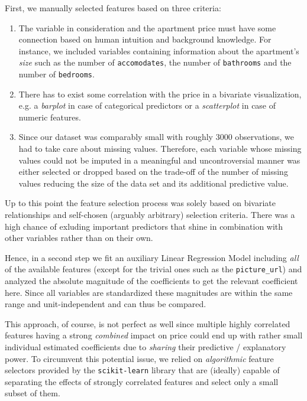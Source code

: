 \documentclass[12pt, letterpaper]{article}
\begin{document}
First, we manually selected features based on three criteria:
\begin{enumerate}
    \item The variable in consideration and the apartment price must have some connection based on human intuition and background knowledge. For instance, we included variables containing information about the apartment's \emph{size} such as the number of \texttt{accomodates}, the number of \texttt{bathrooms} and the number of \texttt{bedrooms}.
    \item There has to exist some correlation with the price in a bivariate visualization, e.g. a \emph{barplot} in case of categorical predictors or a \emph{scatterplot} in case of numeric features.
    \item Since our dataset was comparably small with roughly $3000$ observations, we had to take care about missing values.
          Therefore, each variable whose missing values could not be imputed in a meaningful and uncontroversial manner was either selected or dropped based on the trade-off of the number of missing values reducing the size of the data set and its additional predictive value.
\end{enumerate}

Up to this point the feature selection process was solely based on bivariate relationships and self-chosen (arguably arbitrary) selection criteria.
There was a high chance of exluding important predictors that shine in combination with other variables rather than on their own.

Hence, in a second step we fit an auxiliary Linear Regression Model including \emph{all} of the available features (except for the trivial ones such as the \verb|picture_url|) and analyzed the absolute magnitude of the coefficients to get the relevant coefficient here. 
Since all variables are standardized these magnitudes are within the same range and unit-independent and can thus be compared.

This approach, of course, is not perfect as well since multiple highly correlated features having a strong \emph{combined} impact on price could end up with rather small individual estimated coefficients due to \emph{sharing} their predictive / explanatory power.
To circumvent this potential issue, we relied on \emph{algorithmic} feature selectors provided by the \texttt{scikit-learn} library that are (ideally) capable of separating the effects of strongly correlated features and select only a small subset of them. 
\end{document}
